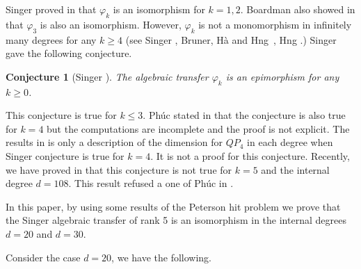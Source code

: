 \documentclass[reqno]{amsart}
\theoremstyle{plain}
\newtheorem{con}[thm]{Conjecture}
\theoremstyle{definition}
\theoremstyle{plain}
\theoremstyle{definition}
\numberwithin{equation}{section}
\begin{document}
Singer proved in \cite{si1} that $\varphi_k$ is an isomorphism for $k=1,2$. Boardman also showed in \cite{bo} that $\varphi_3$ is also an isomorphism.  However, $\varphi_k$ is not a monomorphism in infinitely many degrees for any $k \geqslant 4$ (see Singer \cite{si1}, Bruner, H\`a and H\uhorn ng~\cite{br}, H\uhorn ng \cite{hu}.) Singer gave the following conjecture.

\begin{con}[Singer \cite{si1}]\label{sconj} The algebraic transfer $\varphi_k$ is an epimorphism for any $k \geqslant 0$.
\end{con}

This conjecture is true for $k\leqslant 3$. Ph\'uc stated in \cite{p231} that the conjecture is also true for $k = 4$ but the computations are incomplete and the proof is not explicit. The results in \cite{p231} is only a description of the dimension for $QP_4$ in each degree when Singer conjecture is true for $k=4$. It is not a proof for this conjecture. Recently, we have proved in \cite{suw} that this conjecture is not true for $k = 5$ and the internal degree $d = 108$. This result refused a one of Ph\'uc in \cite{p24}.

In this paper, by using some results of the Peterson hit problem we prove that the Singer algebraic transfer of rank 5 is an isomorphism in the internal degrees $d = 20$ and $d = 30$. 

Consider the case $d = 20$, we have the following.
\end{document}
